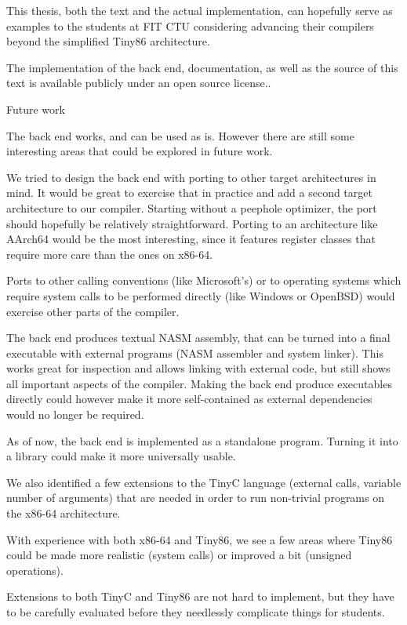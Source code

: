 This thesis, both the text and the actual implementation, can hopefully serve as
examples to the students at FIT CTU considering advancing their compilers beyond
the simplified Tiny86 architecture.

The implementation of the back end, documentation, as well as the source of this
text is available publicly under an open source
license..

\sec Future work

The back end works, and can be used as is. However there are still some
interesting areas that could be explored in future work.

We tried to design the back end with porting to other target architectures in
mind. It would be great to exercise that in practice and add a second target
architecture to our compiler. Starting without a peephole optimizer, the port
should hopefully be relatively straightforward. Porting to an architecture like
AArch64 would be the most interesting, since it features register classes that
require more care than the ones on x86-64.

Ports to other calling conventions (like Microsoft's) or to operating systems
which require system calls to be performed directly (like Windows or OpenBSD)
would exercise other parts of the compiler.

The back end produces textual NASM assembly, that can be turned into a final
executable with external programs (NASM assembler and system linker). This works
great for inspection and allows linking with external code, but still shows all
important aspects of the compiler. Making the back end produce executables
directly could however make it more self-contained as external dependencies
would no longer be required.

As of now, the back end is implemented as a standalone program. Turning it into a
library could make it more universally usable.

We also identified a few extensions to the TinyC language (external calls,
variable number of arguments) that are needed in order to run non-trivial
programs on the x86-64 architecture.

With experience with both x86-64 and Tiny86, we see a few areas where Tiny86
could be made more realistic (system calls) or improved a bit (unsigned
operations).

Extensions to both TinyC and Tiny86 are not hard to implement, but they have to
be carefully evaluated before they needlessly complicate things for students.

